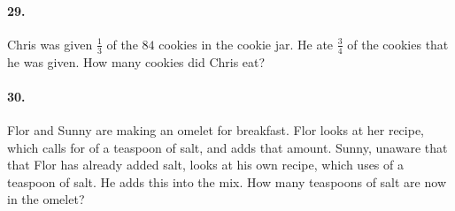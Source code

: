 \documentclass[16pt]{article}
\begin{document}
\paragraph{29. } Chris was given $\frac{1}{3}$ of the $84$ cookies in the cookie jar. He ate $\frac{3}{4}$ of the cookies that he was given. How many cookies did Chris eat?

\paragraph{30. } Flor and Sunny are making an omelet for breakfast. Flor looks at her recipe, which calls for 
 of a teaspoon of salt, and adds that amount. Sunny, unaware that that Flor has already added salt, looks at his own recipe, which uses 
 of a teaspoon of salt. He adds this into the mix. How many teaspoons of salt are now in the omelet?
\end{document}
